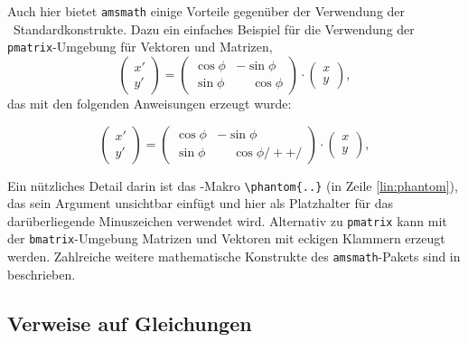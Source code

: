 Auch hier bietet \texttt{amsmath} einige Vorteile gegenüber der Verwendung
der \latex\ Standardkonstrukte. Dazu ein einfaches Beispiel für die
Verwendung der \texttt{pmatrix}-Umgebung für Vektoren und Matrizen,
%
\begin{equation}
	\begin{pmatrix}
		x' \\ y'
	\end{pmatrix}
	=
	\begin{pmatrix}
		\cos \phi & -\sin \phi           \\
		\sin \phi & \phantom{-}\cos \phi
	\end{pmatrix}
	\cdot
	\begin{pmatrix}
		x \\ y
	\end{pmatrix} ,
\end{equation}
%
das mit den folgenden Anweisungen erzeugt wurde:
%
\begin{LaTeXCode}
\begin{equation}
	\begin{pmatrix} 
			x' \\ 
			y' 
	\end{pmatrix}
	= 
	\begin{pmatrix}
		  \cos \phi &           -\sin \phi \\
		  \sin \phi & \phantom{-}\cos \phi /+ \label{lin:phantom} +/
	\end{pmatrix} 
	\cdot
	\begin{pmatrix} 
			x \\ 
			y 
	\end{pmatrix} ,
\end{equation}
\end{LaTeXCode}
%
Ein nützliches Detail darin ist das \tex-Makro \verb!\phantom{..}! (in Zeile
\ref{lin:phantom}), das sein Argument unsichtbar einfügt und hier als
Platzhalter für das darüberliegende Minuszeichen verwendet wird. Alternativ
zu \texttt{pmatrix} kann mit der \texttt{bmatrix}-Umgebung Matrizen und
Vektoren mit eckigen Klammern erzeugt werden. Zahlreiche weitere
mathematische Konstrukte des \texttt{amsmath}-Pakets sind in
\cite{Mittelbach2020} beschrieben.


\subsection{Verweise auf Gleichungen}
\label{sec:VerweiseAufGleichungen}

